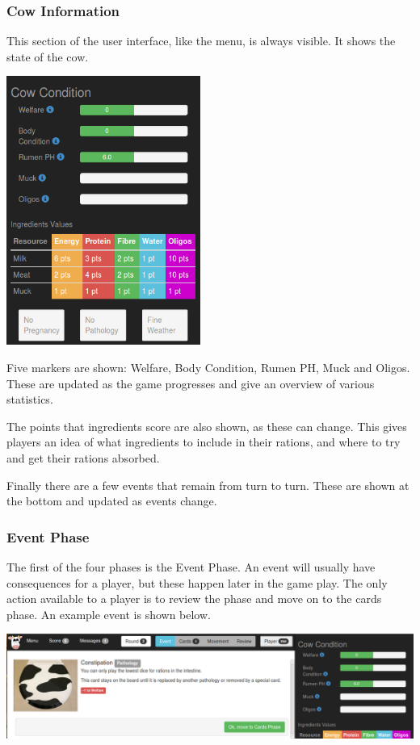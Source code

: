 \subsubsection{Cow Information}
This section of the user interface, like the menu, is always visible. It shows the state of the cow.
\begin{center}
	\includegraphics[width=2.5in]{Images/app3/ui-cow-info}
\end{center}

Five markers are shown: Welfare, Body Condition, Rumen PH, Muck and Oligos. These are updated as the game progresses and give an overview of various statistics.

The points that ingredients score are also shown, as these can change. This gives players an idea of what ingredients to include in their rations, and where to try and get their rations absorbed.

Finally there are a few events that remain from turn to turn. These are shown at the bottom and updated as events change.

\subsubsection{Event Phase}
The first of the four phases is the Event Phase. An event will usually have consequences for a player, but these happen later in the game play. The only action available to a player is to review the phase and move on to the cards phase. An example event is shown below.
\begin{center}
	\includegraphics[width=\textwidth]{Images/app3/ui-phase-event}
\end{center}

